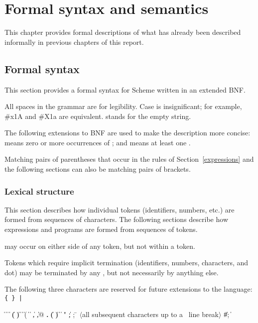 \chapter{Formal syntax and semantics}
\label{formalchapter}

This chapter provides formal descriptions of what has already been
described informally in previous chapters of this report.



\section{Formal syntax}
\label{BNF}

This section provides a formal syntax for Scheme written in an extended
BNF.

All spaces in the grammar are for legibility.  Case is insignificant;
for example, {\cf \#x1A} and {\cf \#X1a} are equivalent.  
stands for the empty string.

The following extensions to BNF are used to make the description more
concise:   means zero or more occurrences of
; and  means at least one
.

Matching pairs of parentheses that occur in the rules of
Section~\ref{expressions} and the following sections can also be
matching pairs of brackets.

\subsection{Lexical structure}

This section describes how individual tokens (identifiers,
numbers, etc.) are formed from sequences of characters.  The following
sections describe how expressions and programs are formed from sequences
of tokens.

 may occur on either side of any token, but not
within a token.

\vest Tokens which require implicit termination (identifiers, numbers,
characters, and dot) may be terminated by any , but not
necessarily by anything else.



The following three characters are reserved for future extensions to the
language: {\tt \verb"{" \verb"}" \verb"|"}

\begin{grammar}%
 \:  \|  \| 
\>  \|  \| 
\>  \| ( \| ) \| \openbracket{} \| \closedbracket{} \| \sharpsign( \| \singlequote{} \| \backquote{} \| , \| ,@ \| {\bf.}
 \:  \| ( \| ) \| \openbracket{} \| \closedbracket{} " \| ;
 \: 
 \: ; \= $\langle$\rm all subsequent characters up to a
		    \>\ \rm line break$\rangle$
\qquad  \| \#; 
 \:  \| 
 \: %
\end{grammar}

